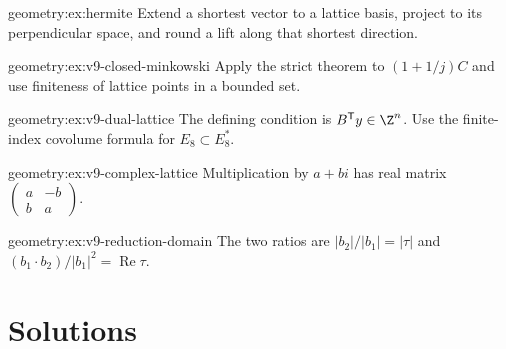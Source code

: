 \begin{hint}{geometry:ex:hermite}
Extend a shortest vector to a lattice basis, project to its perpendicular
space, and round a lift along that shortest direction.
\end{hint}
\begin{hint}{geometry:ex:v9-closed-minkowski}
Apply the strict theorem to $(1+1/j)C$ and use finiteness of lattice
points in a bounded set.
\end{hint}
\begin{hint}{geometry:ex:v9-dual-lattice}
The defining condition is $B^{\mathsf T}y\in\Z^n$.
Use the finite-index covolume formula for $E_8\subset E_8^*$.
\end{hint}
\begin{hint}{geometry:ex:v9-complex-lattice}
Multiplication by $a+bi$ has real matrix
$\left(\begin{smallmatrix}a&-b\\b&a\end{smallmatrix}\right)$.
\end{hint}
\begin{hint}{geometry:ex:v9-reduction-domain}
The two ratios are $|b_2|/|b_1|=|\tau|$ and
$(b_1\cdot b_2)/|b_1|^2=\operatorname{Re}\tau$.
\end{hint}

\section{Solutions}

